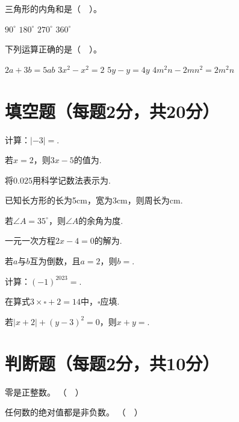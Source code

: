 \documentclass{exam}
\begin{document}
\begin{questions}
\question 三角形的内角和是（ ）。
\begin{oneparchoices}
\choice $90^\circ$ \choice $180^\circ$ \choice $270^\circ$ \choice $360^\circ$
\end{oneparchoices}

\question 下列运算正确的是（ ）。
\begin{oneparchoices}
\choice $2a + 3b = 5ab$ \choice $3x^2 - x^2 = 2$ \choice $5y - y = 4y$ \choice $4m^2n - 2mn^2 = 2m^2n$
\end{oneparchoices}

\section{填空题（每题2分，共20分）}
\question 计算：$|-3| = $\underline{\hspace{2cm}}.

\question 若$x=2$，则$3x - 5$的值为\underline{\hspace{2cm}}.

\question 将$0.025$用科学记数法表示为\underline{\hspace{2cm}}.

\question 已知长方形的长为5cm，宽为3cm，则周长为\underline{\hspace{2cm}}cm.

\question 若$\angle A = 35^\circ$，则$\angle A$的余角为\underline{\hspace{2cm}}度.

\question 一元一次方程$2x - 4 = 0$的解为\underline{\hspace{2cm}}.

\question 若$a$与$b$互为倒数，且$a=2$，则$b=$\underline{\hspace{2cm}}.

\question 计算：$(-1)^{2023} = $\underline{\hspace{2cm}}.

\question 在算式$3 \times \square + 2 = 14$中，$\square$应填\underline{\hspace{2cm}}.

\question 若$|x+2| + (y-3)^2 = 0$，则$x+y=$\underline{\hspace{2cm}}.

\section{判断题（每题2分，共10分）}
\question 零是正整数。 （ ）

\question 任何数的绝对值都是非负数。 （ ）


\end{questions}
\end{document}
